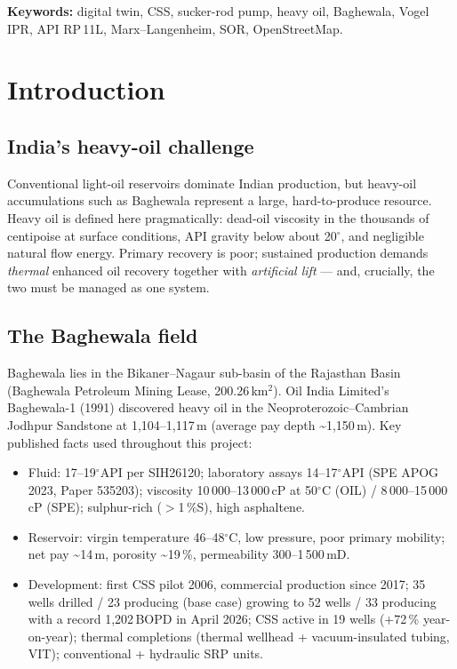 \documentclass[12pt,a4paper]{report}
\begin{document}
\textbf{Keywords:} digital twin, CSS, sucker-rod pump, heavy oil, Baghewala,
Vogel IPR, API RP\,11L, Marx--Langenheim, SOR, OpenStreetMap.

\tableofcontents
\listoffigures
\listoftables

\chapter{Introduction}
\section{India's heavy-oil challenge}
Conventional light-oil reservoirs dominate Indian production, but heavy-oil
accumulations such as Baghewala represent a large, hard-to-produce resource.
Heavy oil is defined here pragmatically: dead-oil viscosity in the thousands of
centipoise at surface conditions, API gravity below about 20$^\circ$, and
negligible natural flow energy. Primary recovery is poor; sustained production
demands \emph{thermal} enhanced oil recovery together with \emph{artificial
lift} --- and, crucially, the two must be managed as one system.

\section{The Baghewala field}
Baghewala lies in the Bikaner--Nagaur sub-basin of the Rajasthan Basin
(Baghewala Petroleum Mining Lease, 200.26\,km$^2$). Oil India Limited's
Baghewala-1 (1991) discovered heavy oil in the Neoproterozoic--Cambrian Jodhpur
Sandstone at 1,104--1,117\,m (average pay depth \textasciitilde1,150\,m).
Key published facts used throughout this project:
\begin{itemize}
  \item Fluid: 17--19$^\circ$API per SIH26120; laboratory assays 14--17$^\circ$API
    (SPE APOG 2023, Paper 535203); viscosity 10\,000--13\,000\,cP at 50$^\circ$C
    (OIL) / 8\,000--15\,000\,cP (SPE); sulphur-rich ($>$1\,\%S), high asphaltene.
  \item Reservoir: virgin temperature 46--48$^\circ$C, low pressure, poor primary
    mobility; net pay \textasciitilde14\,m, porosity \textasciitilde19\,\%,
    permeability 300--1\,500\,mD.
  \item Development: first CSS pilot 2006, commercial production since 2017;
    35 wells drilled / 23 producing (base case) growing to 52 wells / 33
    producing with a record 1,202\,BOPD in April 2026; CSS active in 19 wells
    (+72\,\% year-on-year); thermal completions (thermal wellhead +
    vacuum-insulated tubing, VIT); conventional + hydraulic SRP units.
\end{itemize}
\end{document}
